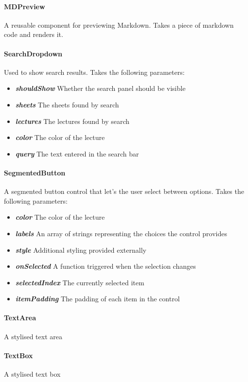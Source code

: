 \paragraph{MDPreview} A reusable component for previewing Markdown. Takes a piece of markdown code and renders it.
\paragraph{SearchDropdown} Used to show search results. Takes the following parameters:
\begin{itemize}
	\item \textit{\textbf{shouldShow}} Whether the search panel should be visible
	\item \textit{\textbf{sheets}} The sheets found by search
	\item \textit{\textbf{lectures}} The lectures found by search
	\item \textit{\textbf{color}} The color of the lecture
	\item \textit{\textbf{query}} The text entered in the search bar
\end{itemize}
\paragraph{SegmentedButton} A segmented button control that let's the user select between options. Takes the following parameters:
\begin{itemize}
	\item \textit{\textbf{color}} The color of the lecture
	\item \textit{\textbf{labels}} An array of strings representing the choices the control provides
	\item \textit{\textbf{style}} Additional styling provided externally
	\item \textit{\textbf{onSelected}} A function triggered when the selection changes
	\item \textit{\textbf{selectedIndex}} The currently selected item
	\item \textit{\textbf{itemPadding}} The padding of each item in the control
\end{itemize}
\paragraph{TextArea} A stylised text area
\paragraph{TextBox} A stylised text box

